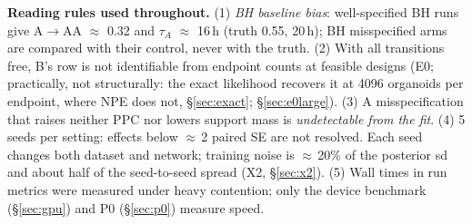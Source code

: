 \documentclass[10pt,a4paper]{article}
\newcommand{\tA}{$\tau_A$}
\newcommand{\sref}[1]{\S\ref{#1}}
\begin{document}
\begin{keybox}
\textbf{Reading rules used throughout.}
(1) \emph{BH baseline bias}: well-specified BH runs give A$\to$AA $\approx$ 0.32 and \tA{} $\approx$ 16\,h (truth 0.55, 20\,h); BH misspecified arms are compared with their control, never with the truth.
(2) With all transitions free, B's row is not identifiable from endpoint counts at feasible designs (E0; practically, not structurally: the exact likelihood recovers it at 4096 organoids per endpoint, where NPE does not, \sref{sec:exact}; \sref{sec:e0large}).
(3) A misspecification that raises neither PPC nor lowers support mass is \emph{undetectable from the fit}.
(4) 5 seeds per setting: effects below $\approx$\,2 paired SE are not resolved. Each seed changes both dataset and network; training noise is $\approx$\,20\% of the posterior sd and about half of the seed-to-seed spread (X2, \sref{sec:x2}).
(5) Wall times in run metrics were measured under heavy contention; only the device benchmark (\S\ref{sec:gpu}) and P0 (\S\ref{sec:p0}) measure speed.
\end{keybox}
\end{document}
